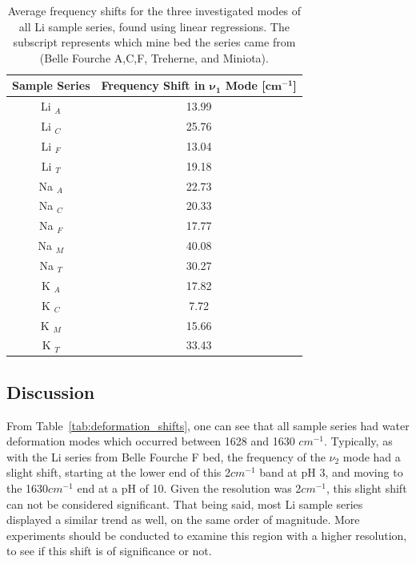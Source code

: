 \begin{table}
	\centering
	\caption{Average frequency shifts for the three investigated modes of all Li sample series, found using linear regressions. The subscript represents which mine bed the series came from (Belle Fourche A,C,F, Treherne, and Miniota).}
	\label{tab:stretch_shifts}
		\begin{tabular}{|c||c|}
			\hline
			\textbf{Sample Series} & \textbf{Frequency Shift in $\bm{\nu_1}$ Mode [$\bm{cm^{-1}}$]} \\
			\hline
			\hline
			Li $_A$ & 13.99 \\
			\hline
			Li $_C$ & 25.76 \\
			\hline
			Li $_F$ & 13.04 \\
			\hline
			Li $_T$ & 19.18 \\
			\hline
			Na $_A$ & 22.73 \\
			\hline
			Na $_C$ & 20.33 \\
			\hline
			Na $_F$ & 17.77 \\
			\hline
			Na $_M$ & 40.08 \\
			\hline
			Na $_T$ & 30.27 \\
			\hline
			K $_A$ & 17.82 \\
			\hline
			K $_C$ & 7.72 \\
			\hline
			K $_M$ & 15.66 \\
			\hline
			K $_T$ & 33.43 \\
			\hline
	\end{tabular}
\end{table}

\subsection{Discussion}

From Table~\ref{tab:deformation_shifts}, one can see that all sample series had water deformation modes which occurred between 1628 and 1630 $cm^{-1}$. Typically, as with the Li series from Belle Fourche F bed,  the frequency of the $\nu_2$ mode had a slight shift, starting at the lower end of this 2$cm^{-1}$ band at pH 3, and moving to the 1630$cm^{-1}$ end at a pH of 10. Given the resolution was 2$cm^{-1}$, this slight shift can not be considered significant. That being said, most Li sample series displayed a similar trend as well, on the same order of magnitude. More experiments should be conducted to examine this region with a higher resolution, to see if this shift is of significance or not.


